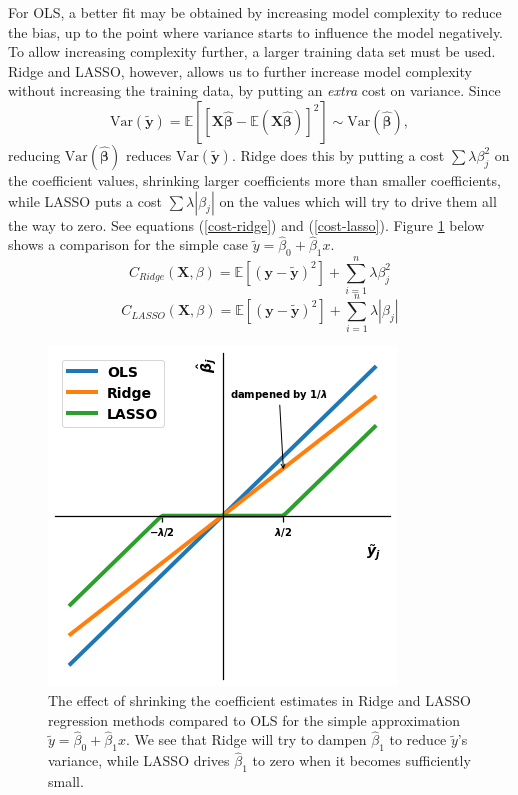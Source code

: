 \documentclass[]{article}
\begin{document}
For OLS, a better fit may be obtained by increasing model complexity to reduce the bias, up to the point where variance starts to influence the model negatively. To allow increasing complexity further, a larger training data set must be used. Ridge and LASSO, however, allows us to further increase model complexity without increasing the training data, by putting an \textit{extra} cost on variance. Since 
\begin{equation}
	\mathrm{Var}(\mathbf{\tilde{y}}) = \mathbb{E}[[\mathbf{X \hat{\beta}} - \mathbb{E}(\mathbf{X \hat{\beta}})]^2] \sim \mathrm{Var}(\mathbf{\hat{\beta}}),
\end{equation}
reducing $\mathrm{Var}(\mathbf{\hat{\beta}})$ reduces $\mathrm{Var}(\mathbf{\tilde{y}})$. Ridge does this by putting a cost $\sum \lambda \beta_j^2$ on the coefficient values, shrinking larger coefficients more than smaller coefficients, while LASSO puts a cost $\sum \lambda |\beta_j|$ on the values which will try to drive them all the way to zero. See equations (\ref{cost-ridge}) and (\ref{cost-lasso}). Figure \ref{fig:ols-ridge-lasso-comp} below shows a comparison for the simple case $\tilde{y} = \hat{\beta}_0 + \hat{\beta}_1x$.
\begin{equation}
\label{cost-ridge}
C_{Ridge}(\mathbf{X},\mathbb{\beta}) = \mathbb{E}[(\mathbf{y} - \mathbf{\tilde{y}})^2] + \sum_{i=1}^{n} \lambda \beta_j^2
\end{equation}
\begin{equation}
\label{cost-lasso}
C_{LASSO}(\mathbf{X},\mathbb{\beta}) = \mathbb{E}[(\mathbf{y} - \mathbf{\tilde{y}})^2] + \sum_{i=1}^{n} \lambda |\beta_j|
\end{equation}

\begin{figure}[!htb]
	\centering
	\includegraphics[width=.5\linewidth]{./results/ols-ridge-lasso-comp.png}
	\caption{The effect of shrinking the coefficient estimates in Ridge and LASSO regression methods compared to OLS for the simple approximation $\tilde{y} = \hat{\beta}_0 + \hat{\beta}_1x$. We see that Ridge will try to dampen $\hat{\beta}_1$ to reduce $\tilde{y}$'s variance, while LASSO drives $\hat{\beta}_1$ to zero when it becomes sufficiently small.}
	\label{fig:ols-ridge-lasso-comp}
\end{figure}
\end{document}
